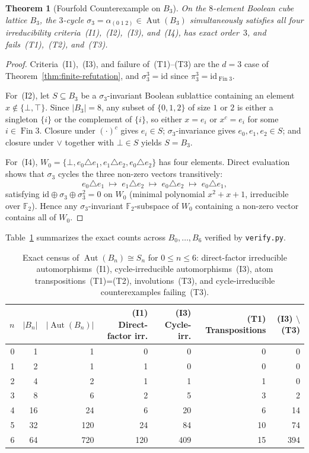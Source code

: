 \documentclass[11pt]{article}
\newtheorem{theorem}{Theorem}[section]
\theoremstyle{definition}
\theoremstyle{remark}
\newcommand{\Aut}{\operatorname{Aut}}
\newcommand{\Fin}{\operatorname{Fin}}
\newcommand{\id}{\mathrm{id}}
\newcommand{\Ftwo}{\mathbb{F}_2}
\begin{document}
\begin{theorem}[Fourfold Counterexample on $B_3$]
\label{thm:b3-fourfold}
On the $8$-element Boolean cube lattice $B_3$, the $3$-cycle $\sigma_3 = \alpha_{(0\;1\;2)} \in \Aut(B_3)$ simultaneously satisfies \emph{all four} irreducibility criteria~\textup{(I1)},~\textup{(I2)},~\textup{(I3)}, and~\textup{(I4)}, has exact order~$3$, and fails~\textup{(T1)},~\textup{(T2)}, and~\textup{(T3)}.
\end{theorem}
\begin{proof}
Criteria~(I1),~(I3), and failure of~(T1)--(T3) are the $d = 3$ case of Theorem~\ref{thm:finite-refutation}, and $\sigma_3^3 = \id$ since $\pi_3^3 = \id_{\Fin 3}$.

For~(I2), let $S \subseteq B_3$ be a $\sigma_3$-invariant Boolean sublattice containing an element $x \notin \{\bot, \top\}$. Since $|B_3| = 8$, any subset of $\{0,1,2\}$ of size $1$ or $2$ is either a singleton $\{i\}$ or the complement of $\{i\}$, so either $x = e_i$ or $x^c = e_i$ for some $i \in \Fin 3$. Closure under $(\cdot)^c$ gives $e_i \in S$; $\sigma_3$-invariance gives $e_0, e_1, e_2 \in S$; and closure under $\vee$ together with $\bot \in S$ yields $S = B_3$.

For~(I4), $W_0 = \{\bot, e_0 \triangle e_1, e_1 \triangle e_2, e_0 \triangle e_2\}$ has four elements. Direct evaluation shows that $\sigma_3$ cycles the three non-zero vectors transitively:
\[
  e_0 \triangle e_1 \;\longmapsto\; e_1 \triangle e_2 \;\longmapsto\; e_0 \triangle e_2 \;\longmapsto\; e_0 \triangle e_1,
\]
satisfying $\id \oplus \sigma_3 \oplus \sigma_3^2 = 0$ on $W_0$ (minimal polynomial $x^2 + x + 1$, irreducible over $\Ftwo$). Hence any $\sigma_3$-invariant $\Ftwo$-subspace of $W_0$ containing a non-zero vector contains all of $W_0$.
\end{proof}

Table~\ref{tab:finite-sweep} summarizes the exact counts across $B_0, \dots, B_6$ verified by \texttt{verify.py}.

\begin{table}[ht]
\centering
\caption{Exact census of $\Aut(B_n) \cong S_n$ for $0 \le n \le 6$: direct-factor irreducible automorphisms~(I1), cycle-irreducible automorphisms~(I3), atom transpositions~(T1)=(T2), involutions~(T3), and cycle-irreducible counterexamples failing~(T3).}
\label{tab:finite-sweep}
\medskip
\begin{tabular}{@{}rrrrrrr@{}}
\toprule
$n$ & $|B_n|$ & $|\Aut(B_n)|$ & (I1) Direct-factor irr. & (I3) Cycle-irr. & (T1) Transpositions & (I3) $\setminus$ (T3) \\
\midrule
0 & 1  &   1 &   0 &   0 &  0 &   0 \\
1 & 2  &   1 &   1 &   0 &  0 &   0 \\
2 & 4  &   2 &   1 &   1 &  1 &   0 \\
3 & 8  &   6 &   2 &   5 &  3 &   2 \\
4 & 16 &  24 &   6 &  20 &  6 &  14 \\
5 & 32 & 120 &  24 &  84 & 10 &  74 \\
6 & 64 & 720 & 120 & 409 & 15 & 394 \\
\bottomrule
\end{tabular}
\end{table}
\end{document}
